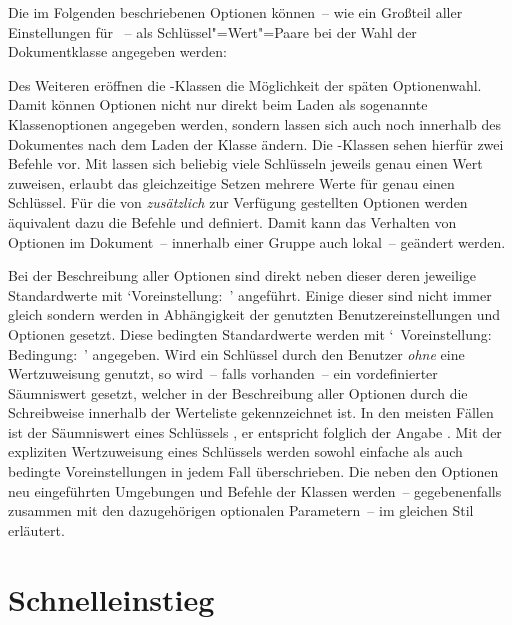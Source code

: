 Die im Folgenden beschriebenen Optionen können~-- wie ein Großteil aller 
Einstellungen für \KOMAScript~-- als Schlüssel"=Wert"=Paare bei der Wahl der 
Dokumentklasse angegeben werden:

Des Weiteren eröffnen die \KOMAScript-Klassen die Möglichkeit der späten 
Optionenwahl. Damit können Optionen nicht nur direkt beim Laden als sogenannte 
Klassenoptionen angegeben werden, sondern lassen sich auch noch innerhalb des 
Dokumentes nach dem Laden der Klasse ändern. Die \KOMAScript-Klassen sehen 
hierfür zwei Befehle vor. Mit 
lassen sich beliebig viele Schlüsseln jeweils genau einen Wert zuweisen, 
 erlaubt das gleichzeitige 
Setzen mehrere Werte für genau einen Schlüssel. Für die von \TUDScript 
\emph{zusätzlich} zur Verfügung gestellten Optionen werden äquivalent dazu die 
Befehle  und 
 definiert. Damit kann das 
Verhalten von Optionen im Dokument~-- innerhalb einer Gruppe auch lokal~-- 
geändert werden.

Bei der Beschreibung aller Optionen sind direkt neben dieser deren jeweilige 
Standardwerte mit \mbox{\enquote*{Voreinstellung: }} angeführt. 
Einige dieser sind nicht immer gleich sondern werden in Abhängigkeit der 
genutzten Benutzereinstellungen und Optionen gesetzt. Diese bedingten 
Standardwerte werden mit 
\mbox{\enquote*{%
  Voreinstellung: \,\textbar\,Bedingung: %
}}
angegeben. Wird ein Schlüssel durch den Benutzer \emph{ohne} eine Wertzuweisung 
genutzt, so wird~-- falls vorhanden~-- ein vordefinierter Säumniswert gesetzt, 
welcher in der Beschreibung aller Optionen durch die~ 
Schreibweise innerhalb der Werteliste gekennzeichnet ist. In den meisten Fällen 
ist der Säumniswert eines Schlüssels , er entspricht folglich der 
Angabe . Mit der expliziten Wertzuweisung eines 
Schlüssels werden sowohl einfache als auch bedingte Voreinstellungen in jedem 
Fall überschrieben. Die neben den Optionen neu eingeführten Umgebungen und 
Befehle der Klassen werden~-- gegebenenfalls zusammen mit den dazugehörigen 
optionalen Parametern~-- im gleichen Stil erläutert.



\section{Schnelleinstieg}

